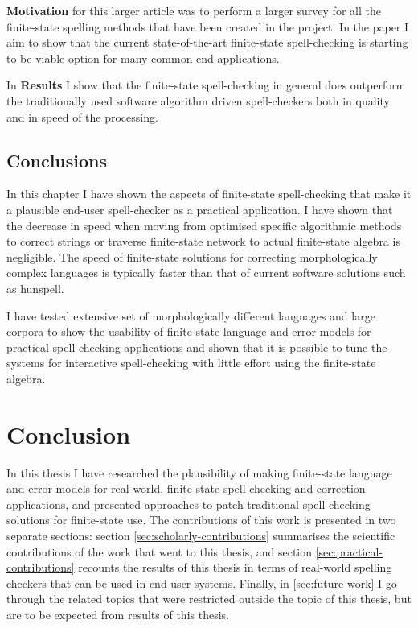 \documentclass[officiallayout,draft]{unihelcompling}
\begin{document}
\textbf{Motivation} for this larger article was to perform a larger survey
for all the finite-state spelling methods that have been created in the
project. In the paper I aim to show that the current state-of-the-art
finite-state spell-checking is starting to be viable option for many
common end-applications.

In \textbf{Results} I show that the finite-state spell-checking in general
does outperform the traditionally used software algorithm driven spell-checkers
both in quality and in speed of the processing.

\section{Conclusions}

In this chapter I have shown the aspects of finite-state spell-checking that
make it a plausible end-user spell-checker as a practical application. I have
shown that the decrease in speed when moving from optimised specific
algorithmic methods to correct strings or traverse finite-state network to
actual finite-state algebra is negligible. The speed of finite-state solutions
for correcting morphologically complex languages is typically faster than
that of current software solutions such as hunspell.

I have tested extensive set of morphologically different languages and
large corpora to show the usability of finite-state language and error-models
for practical spell-checking applications and shown that it is possible to tune
the systems for interactive spell-checking with little effort using the
finite-state algebra.

\chapter{Conclusion}
\label{chap:conclusion}

In this thesis I have researched the plausibility of making finite-state
language and error models for real-world, finite-state spell-checking and
correction applications, and presented approaches to patch traditional
spell-checking solutions for finite-state use. The contributions of this work
is presented in two separate sections: section
\ref{sec:scholarly-contributions} summarises the scientific contributions of
the work that went to this thesis, and section
\ref{sec:practical-contributions} recounts the results of this thesis in terms
of real-world spelling checkers that can be used in end-user systems. Finally,
in \ref{sec:future-work} I go through the related topics that were restricted
outside the topic of this thesis, but are to be expected from results of this
thesis.
\end{document}

